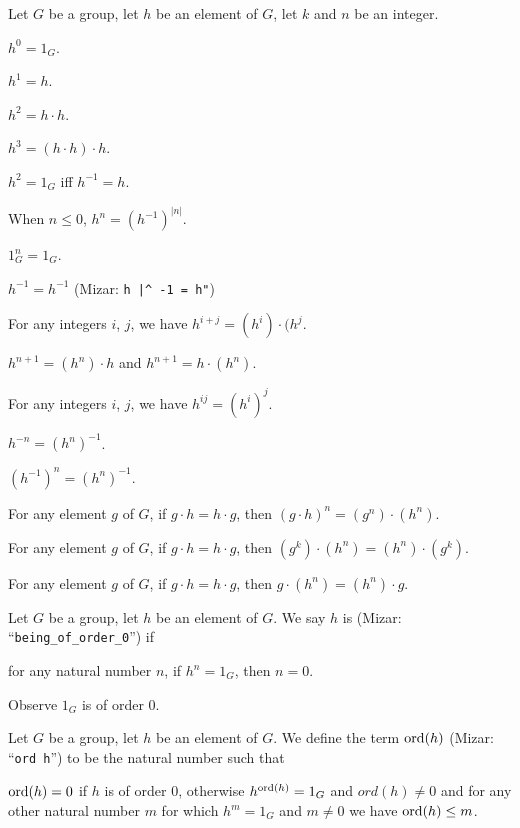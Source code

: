 Let $G$ be a group, let $h$ be an element of $G$, let $k$ and $n$ be an integer.
\begin{thm}
\item\label{group1:25} $h^{0}=1_{G}$.
\item\label{group1:26} $h^{1}=h$.
\item\label{group1:27} $h^{2}=h\cdot h$.
\item\label{group1:28} $h^{3}=(h\cdot h)\cdot h$.
\item\label{group1:29} $h^{2}=1_{G}$ iff $h^{-1}=h$.
\item\label{group1:30} When $n\leq0$, $h^{n}=(h^{-1})^{|n|}$.
\item\label{group1:31} $1_{G}^{n}=1_{G}$.
\item\label{group1:32} $h^{-1}=h^{-1}$ (Mizar: \verb#h |^ -1 = h"#)
\item\label{group1:33} For any integers $i$, $j$, we have $h^{i+j}=(h^{i})\cdot(h^{j}$.
\item\label{group1:34} $h^{n+1}=(h^{n})\cdot h$ and $h^{n+1}=h\cdot(h^{n})$.
\item\label{group1:35} For any integers $i$, $j$, we have $h^{ij}=(h^{i})^{j}$.
\item\label{group1:36} $h^{-n}=(h^{n})^{-1}$.
\item\label{group1:37} $(h^{-1})^{n}=(h^{n})^{-1}$.
\item\label{group1:38} For any element $g$ of $G$, if $g\cdot h=h\cdot g$,
  then $(g\cdot h)^{n}=(g^{n})\cdot(h^{n})$.
\item\label{group1:39} For any element $g$ of $G$, if $g\cdot h=h\cdot g$,
  then $(g^{k})\cdot(h^{n})=(h^{n})\cdot (g^{k})$.
\item\label{group1:40} For any element $g$ of $G$, if $g\cdot h=h\cdot g$,
  then $g\cdot(h^{n})=(h^{n})\cdot g$.
\end{thm}

\begin{definition}
Let $G$ be a group, let $h$ be an element of $G$.
We say $h$ is  (Mizar: ``\verb#being_of_order_0#'') if
\begin{defn}
\item for any natural number $n$, if $h^{n}=1_{G}$, then $n=0$.
\end{defn}
\end{definition}

Observe $1_{G}$ is of order 0.

\begin{definition}
Let $G$ be a group, let $h$ be an element of $G$.
We define the term $\operatorname{ord}(h)$ (Mizar: ``\verb#ord h#'') to be the natural
number such that
\begin{defn}
\item $\operatorname{ord}(h)=0$ if $h$ is of order 0, otherwise $h^{\operatorname{ord}(h)}=1_{G}$
  and $ord(h)\neq0$ and for any other natural number $m$ for which
  $h^{m}=1_{G}$ and $m\neq0$ we have $\operatorname{ord}(h)\leq m$.
\end{defn}
\end{definition}

